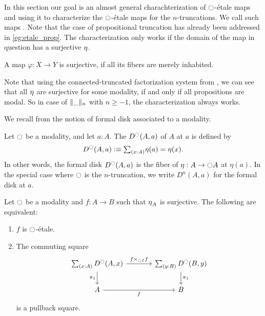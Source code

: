 \documentclass[9pt,twosided]{amsart}
\begin{document}
In this section our goal is an almost general charachterization of ${\ocircle}$-étale maps and using it to characterize the ${\ocircle}$-\'etale maps for the $n$-truncations. We call such maps . Note that the case of propositional truncation has already been addressed in \cref{eg:etale_prop}.
The characterization only works if the domain of the map in question has a surjective ${\eta_{}}$.
\begin{defn}
  A map $\varphi:X\to Y$ is surjective, if all its fibers are merely inhabited.
\end{defn}
Note that using the connected-truncated factorization system from \cite{RijkeSpittersShulman}, we can see that all ${\eta_{}}$ are surjective for some modality, if and only if all propositions are modal.
So in case of $\trunc{n}{\_}$ with $n\geq -1$, the characterization always works.

We recall from \cite{wellen-thesis} the notion of formal disk associated to a modality.

\begin{defn}
  Let ${\ocircle}$ be a modality, and let $a:A$. The  $D^{{\ocircle}}(A,a)$ of $A$ at $a$ is defined by
  \begin{equation*}
    D^\modal(A,a)\defeq \sm{x:A}\eta(a)=\eta(x).
  \end{equation*}
  In other words, the formal disk $D^{\ocircle}(A,a)$ is the fiber of $\eta:A\to{\ensuremath{\ocircle}} A$ at $\eta(a)$. In the special case where ${\ocircle}$ is the $n$-truncation, we write $D^n(A,a)$ for the formal disk at $a$. 
\end{defn}

\begin{lem}\label{lem:etale_char}
Let ${\ocircle}$ be a modality and $f:A\to B$ such that ${\eta_{}}_A$ is surjective. The following are equivalent:
\begin{enumerate}
\item $f$ is ${\ocircle}$-\'etale.
\item The commuting square
\begin{equation*}
\begin{tikzcd}[column sep=large]
\sm{x:A}D^\modal(A,x) \arrow[d,swap,"\pi_1"] \arrow[r,"{f\times_{\modal f} f}"] & \sm{y:B}D^\modal(B,y) \arrow[d,"\pi_1"] \\
A \arrow[r,swap,"f"] & B
\end{tikzcd}
\end{equation*}
is a pullback square.
\end{enumerate}
\end{lem}
\end{document}
